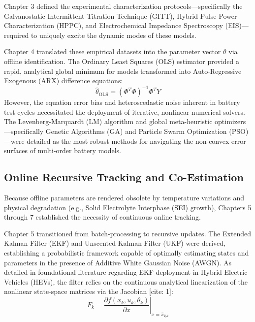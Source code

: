 Chapter 3 defined the experimental characterization protocols—specifically the Galvanostatic Intermittent Titration Technique (GITT), Hybrid Pulse Power Characterization (HPPC), and Electrochemical Impedance Spectroscopy (EIS)—required to uniquely excite the dynamic modes of these models. 

Chapter 4 translated these empirical datasets into the parameter vector $\theta$ via offline identification. The Ordinary Least Squares (OLS) estimator provided a rapid, analytical global minimum for models transformed into Auto-Regressive Exogenous (ARX) difference equations:
\begin{equation}
\label{eq:ols_summary}
\hat{\theta}_{\mathrm{OLS}} = (\Phi^T \Phi)^{-1} \Phi^T Y
\end{equation}
However, the equation error bias and heteroscedastic noise inherent in battery test cycles necessitated the deployment of iterative, nonlinear numerical solvers. The Levenberg-Marquardt (LM) algorithm and global meta-heuristic optimizers—specifically Genetic Algorithms (GA) and Particle Swarm Optimization (PSO)—were detailed as the most robust methods for navigating the non-convex error surfaces of multi-order battery models.

\subsection{Online Recursive Tracking and Co-Estimation}
\label{subsec:summary_online}

Because offline parameters are rendered obsolete by temperature variations and physical degradation (e.g., Solid Electrolyte Interphase (SEI) growth), Chapters 5 through 7 established the necessity of continuous online tracking. 

Chapter 5 transitioned from batch-processing to recursive updates. The Extended Kalman Filter (EKF) and Unscented Kalman Filter (UKF) were derived, establishing a probabilistic framework capable of optimally estimating states and parameters in the presence of Additive White Gaussian Noise (AWGN). As detailed in foundational literature regarding EKF deployment in Hybrid Electric Vehicles (HEVs), the filter relies on the continuous analytical linearization of the nonlinear state-space matrices via the Jacobian \cite{plett2004extended}[cite: 1]:
\begin{equation}
\label{eq:jacobian_summary}
F_k = \left. \frac{\partial f(x_k, u_k, \theta_k)}{\partial x} \right|_{x = \hat{x}_{k|k}}
\end{equation}

